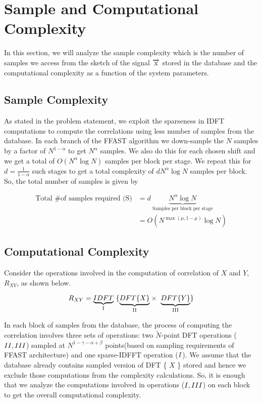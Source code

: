 \section{Sample and Computational Complexity}
In this section, we will analyze the sample complexity which is the  number of samples we access from the sketch of the signal $\overrightarrow{\mathrm{x}}$ stored in the database and the computational complexity as a function of the system parameters.

\subsection{\bf Sample Complexity} As stated in the problem statement, we exploit the sparseness in IDFT computations to compute the correlations using less number of samples from the database. In each branch of the FFAST algorithm we down-sample the $N$ samples by a factor of $N^{1-\alpha}$ to get $N^{\alpha}$ samples. We also do this for each chosen shift and we get a total of  $O(N^{\alpha}\log N)$ samples per block per stage. We repeat this for $d = \frac{1}{1-\alpha}$ such stages to get a total complexity of $dN^{\alpha}\log N$ samples per block. So, the total number of samples is given by  

\begin{align*}
\text{Total \# of samples required (S)} &=  d \ \underset{\text{Samples per block per stage} }{\underbrace{N^{\alpha}\log N}}\\
   &=   O(N^{\max(\mu,1-\mu)}\log N)
\end{align*}



\subsection{\bf Computational Complexity}

Consider the operations involved in the computation of correlation of $X$ and $Y$, $R_{XY}$, as shown below.

\[  R_{XY} = \underset{\text{ \RNum{1} } } {\underbrace{IDFT}} \ \{ \underset{\text{ \RNum{2} } }{\underbrace{DFT\{ X \} } }  \times \ \underset{\text{ \RNum{3} } }{\underbrace{DFT\{ Y \} } }  \}  \]


In each block of samples from the database, the process of computing the correlation involves three sets of operations: two $\tilde{N}$-point DFT operations ($\RNum{2}, \RNum{3}$) sampled at $N^{1-\gamma-\alpha+\beta}$ points(based on sampling requirements of FFAST architecture) and one sparse-IDFFT operation ($\RNum{1}$). We assume that the database already contains sampled version of DFT \{ $X$ \} stored and hence we exclude those computations from the complexity calculations. So, it is enough that we analyze the computations involved in operations ($\RNum{1}, \RNum{3}$) on each block to get the overall computational complexity.

